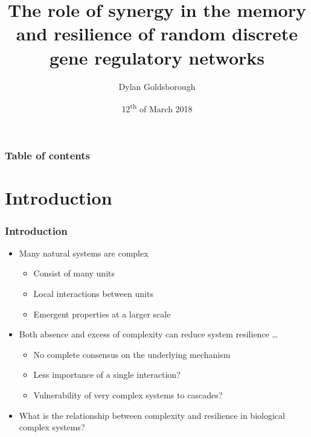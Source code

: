 \documentclass[hyperref={pdfpagelabels=false}]{beamer}
\title{The role of synergy in the memory and resilience of random discrete gene regulatory networks}
\author{Dylan Goldsborough}
\date{12\textsuperscript{th} of March 2018}
\begin{document}
\begin{frame}
\titlepage
\end{frame} 

\begin{frame}
\frametitle{Table of contents}
\tableofcontents
\end{frame} 


\section{Introduction} 
\setcounter{subsection}{1}

%
\begin{frame}
\frametitle{Introduction}
\begin{itemize}
\item Many natural systems are complex
\begin{itemize}
\item Consist of many units
\item Local interactions between units
\item Emergent properties at a larger scale
\end{itemize}
\item Both absence and excess of complexity can reduce system resilience \cite{kondoh2003foraging, macarthur1955fluctuations} \dots{}
\begin{itemize}
\item No complete consensus on the underlying mechanism
\item Less importance of a single interaction?
\item Vulnerability of very complex systems to cascades?
\end{itemize}
\item What is the relationship between complexity and resilience in biological complex systems? 
\end{itemize}
\end{frame}
\end{document}
